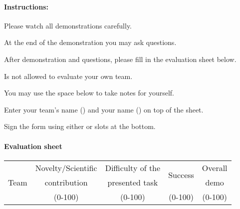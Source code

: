 \paragraph{Instructions:}
\begin{compactenum}
\item Please watch all demonstrations carefully.
\item At the end of the demonstration you may ask questions.
\item After demonstration and questions, please fill in the evaluation sheet below.
\item Is not allowed to evaluate your own team.
\item You may use the space below  to take notes for yourself.
\item Enter your team's name () and your name () on top of the sheet.
\item Sign the form using either  or  slots at the bottom.
\end{compactenum}

\paragraph{Evaluation sheet}
\begin{center}
\begingroup
\newcommand\tableTEAMS{}
\def\do#1{\appto\tableTEAMS{#1 & & & & \\\hline}}%
\expandafter\docsvlist\expandafter{\TEAMSSTAGETWO}
\begin{tabular}{|l|c|c|c|c|}
	\hline
	\multicolumn{1}{|c|}{\multirow{3}{*}{Team}}
	& Novelty/Scientific & Difficulty of the & \multirow{2}{*}{Success} &  Overall  \\
	&    contribution    &  presented task   &                          &   demo    \\
	&      (0-100)       &       (0-100)     &          (0-100)         &  (0-100)  \\
	\hline
	\hline
	\tableTEAMS
\end{tabular}
\endgroup
\end{center}

